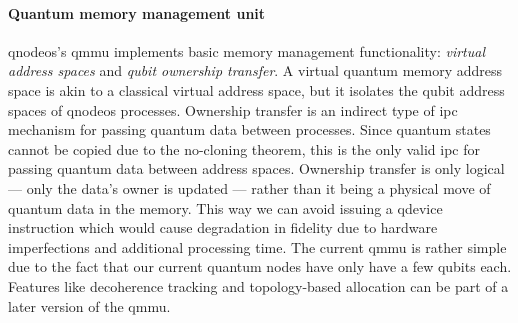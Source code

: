 \paragraph{Quantum memory management unit}

\acrshort{qnodeos}'s \acrshort{qmmu} implements basic memory management functionality: \emph{virtual
address spaces} and \emph{qubit ownership transfer}. A virtual quantum memory address space is akin
to a classical virtual address space, but it isolates the qubit address spaces of \acrshort{qnodeos}
processes. Ownership transfer is an indirect type of \acrfull{ipc} mechanism for passing quantum
data between processes. Since quantum states cannot be copied due to the no-cloning theorem, this is
the only valid \acrshort{ipc} for passing quantum data between address spaces. Ownership transfer is
only logical --- only the data's owner is updated --- rather than it being a physical move of
quantum data in the memory. This way we can avoid issuing a \acrshort{qdevice} instruction which
would cause degradation in fidelity due to hardware imperfections and additional processing time.
The current \acrshort{qmmu} is rather simple due to the fact that our current quantum nodes have
only have a few qubits each. Features like decoherence tracking and topology-based allocation can be
part of a later version of the \acrshort{qmmu}.

\printbibliography[heading=subbibintoc,title={References},notcategory=noprint]
